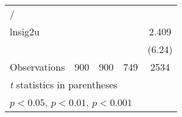 {\begin{tabular}{l*{4}{c}}
\hline
/               &                  &                  &                  &                  \\
lnsig2u         &                  &                  &                  &    2.409\sym{***}\\
                &                  &                  &                  &   (6.24)         \\
\hline
Observations    &      900         &      900         &      749         &     2534         \\
\hline\hline
\multicolumn{5}{l}{\footnotesize \textit{t} statistics in parentheses}\\
\multicolumn{5}{l}{\footnotesize \sym{*} \(p<0.05\), \sym{**} \(p<0.01\), \sym{***} \(p<0.001\)}\\
\end{tabular}
}
